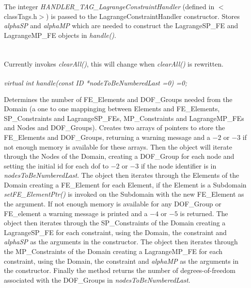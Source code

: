  \\
\\ 
The integer {\em HANDLER\_TAG\_LagrangeConstraintHandler} (defined in
$<$classTags.h$>$) is passed to the LagrangeConstraintHandler
constructor. Stores {\em alphaSP} and {\em alphaMP} which are needed
to construct the LagrangeSP\_FE and LagrangeMP\_FE objects in {\em
handle()}. \\

 \\
\\ 
Currently invokes {\em clearAll()}, this will change when {\em
clearAll()} is rewritten. \\

\\
{\em virtual int handle(const ID *nodeToBeNumberedLast =0) =0;} 

Determines the number of FE\_Elements and DOF\_Groups needed from the
Domain (a one to one mappinging between Elements and FE\_Elements,
SP\_Constraints and LagrangeSP\_FEs, MP\_Constraints and LagrangeMP\_FEs and
Nodes and DOF\_Groups). Creates two arrays of pointers to store the
FE\_Elements and DOF\_Groups, returning a warning message and a $-2$
or $-3$ if not enough memory is available for these arrays. Then the
object will iterate through the Nodes of the Domain, creating a
DOF\_Group for each node and setting the initial id for each dof to
$-2$ or $-3$ if the node identifier is in {\em
nodesToBeNumberedLast}. The object then iterates through the Elements
of the Domain creating a FE\_Element for each Element, if the Element
is a Subdomain {\em setFE\_ElementPtr()} is invoked on the Subdomain
with the new FE\_Element as the argument. If not enough memory is
available for any DOF\_Group or FE\_element a warning message is
printed and a $-4$ or $-5$ is returned. 
The object then iterates through the SP\_Constraints
of the Domain creating a LagrangeSP\_FE for each constraint, using the
Domain, the constraint and {\em alphaSP} as the arguments in the
constructor.
The object then iterates through the MP\_Constraints
of the Domain creating a LagrangeMP\_FE for each constraint, using the
Domain, the constraint and {\em alphaMP} as the arguments in the constructor.
Finally the method returns the
number of degrees-of-freedom associated with the DOF\_Groups in {\em
nodesToBeNumberedLast}. \\


